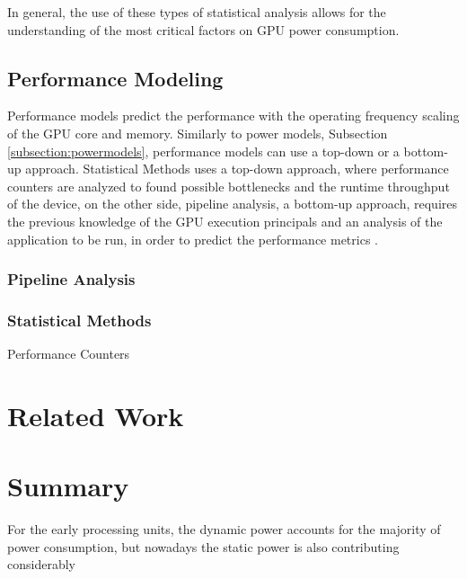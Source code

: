 In general, the use of these types of statistical analysis allows for the understanding of the most critical factors on GPU power consumption.    

\subsection{Performance Modeling}
\label{subsection:performancemodels}

Performance models predict the performance with the operating frequency scaling of the GPU core and memory. Similarly to power models, Subsection \ref{subsection:powermodels}, performance models can use a top-down or a bottom-up approach. Statistical Methods uses a top-down approach, where performance counters are analyzed to found possible bottlenecks and the runtime throughput of the device, on the other side, pipeline analysis, a bottom-up approach, requires the previous knowledge of the GPU execution principals and an analysis of the application to be run, in order to predict the performance metrics \cite{mei_survey_2016}. 

\subsubsection{Pipeline Analysis}

\subsubsection{Statistical Methods}
Performance Counters

\section{Related Work}

\section{Summary}


For the early processing units, the dynamic power accounts for the majority of power consumption, but nowadays the static power is also contributing considerably